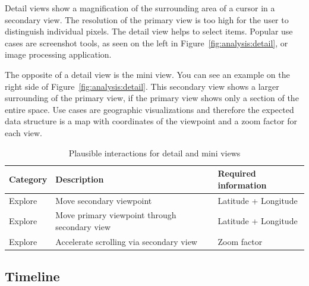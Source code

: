 Detail views show a magnification of the surrounding area of a cursor in a secondary view.
The resolution of the primary view is too high for the user to distinguish individual pixels.
The detail view helps to select items.
Popular use cases are screenshot tools, as seen on the left in Figure~\ref{fig:analysis:detail}, or image processing application.

The opposite of a detail view is the mini view.
You can see an example on the right side of Figure~\ref{fig:analysis:detail}.
This secondary view shows a larger surrounding of the primary view, if the primary view shows only a section of the entire space.
Use cases are geographic visualizations and therefore the expected data structure is a map with coordinates of the viewpoint and a zoom factor for each view.

\begin{table}[H]
  \begin{tabular*}{\textwidth}{lll}
    \bf Category & \bf Description & \bf Required information \\
    \hline
    Explore & Move secondary viewpoint & Latitude + Longitude \\
    Explore & Move primary viewpoint through secondary view & Latitude + Longitude \\
    Explore & Accelerate scrolling via secondary view & Zoom factor \\
  \end{tabular*}
  \caption{Plausible interactions for detail and mini views}%
  \label{fig:analysis:detail:interactions}
\end{table}

\subsection{Timeline}

